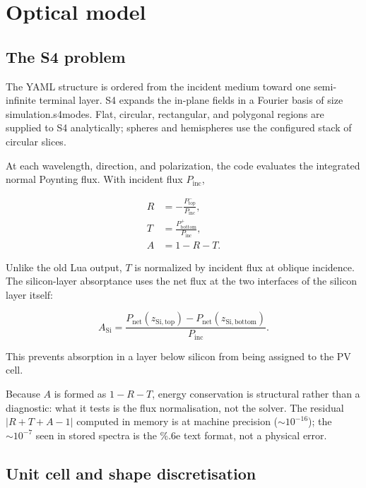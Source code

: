 \documentclass[11pt,a4paper,twoside]{article}
\DeclareRobustCommand{\code}[1]{\begingroup\upshape\ttfamily
  \def\_{\allowbreak\textunderscore\allowbreak}#1\endgroup}
\begin{document}
\section{Optical model}

\subsection{The S4 problem}
\label{sec:s4problem}

The YAML structure is ordered from the incident medium toward one
semi-infinite terminal layer. S4 expands the in-plane fields in a Fourier basis
of size \code{simulation.s4\_modes}. Flat, circular, rectangular, and
polygonal regions are supplied to S4 analytically; spheres and hemispheres use
the configured stack of circular slices.

At each wavelength, direction, and polarization, the code evaluates the
integrated normal Poynting flux. With incident flux \(P_{\mathrm{inc}}\),

\begin{align}
R &= -\frac{P_{\mathrm{top}}^-}{P_{\mathrm{inc}}},\\
T &= \frac{P_{\mathrm{bottom}}^+}{P_{\mathrm{inc}}},\\
A &= 1-R-T.
\end{align}

Unlike the old Lua output, \(T\) is normalized by incident flux at oblique
incidence. The silicon-layer absorptance uses the net flux at the two interfaces
of the silicon layer itself:

\begin{equation}
A_{\mathrm{Si}} =
\frac{P_{\mathrm{net}}(z_{\mathrm{Si,top}})
      -P_{\mathrm{net}}(z_{\mathrm{Si,bottom}})}
     {P_{\mathrm{inc}}}.
\end{equation}

This prevents absorption in a layer below silicon from being assigned to the
PV cell.

Because \(A\) is formed as \(1-R-T\), energy conservation is structural rather
than a diagnostic: what it tests is the flux normalisation, not the solver. The
residual \(|R+T+A-1|\) computed in memory is at machine precision
(\(\sim10^{-16}\)); the \(\sim10^{-7}\) seen in stored spectra is the
\code{\%.6e} text format, not a physical error.

\subsection{Unit cell and shape discretisation}
\label{sec:geometry}
\end{document}
